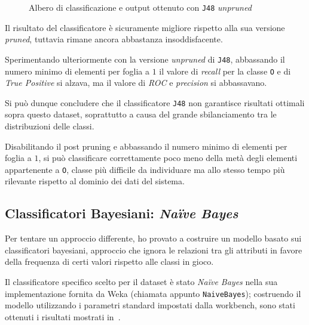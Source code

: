 \begin{figure}[H]
  \centering
  \begin{subfigure}{0.35\textwidth}
    \centering
    \label{fig:j48-unpruned:tree}
  \end{subfigure}
  \hfill
  \begin{subfigure}{0.6\textwidth}
    \centering
    \label{subfig:j48-unpruned:result}
  \end{subfigure}
  \caption{Albero di classificazione e output ottenuto con \texttt{J48} \emph{unpruned}}%
  \label{fig:j48-unpruned}
\end{figure}

Il risultato del classificatore è sicuramente migliore rispetto alla sua versione \emph{pruned}, tuttavia rimane ancora abbastanza insoddisfacente.

Sperimentando ulteriormente con la versione \emph{unpruned} di \texttt{J48},
abbassando il numero minimo di elementi per foglia a \(1\) il valore di \emph{recall} per la classe \texttt{O} e di \emph{True Positive} si alzava,
ma il valore di \emph{ROC} e \emph{precision} si abbassavano.

Si può dunque concludere che il classificatore \texttt{J48} non garantisce risultati ottimali sopra questo dataset, soprattutto a causa del grande sbilanciamento tra le distribuzioni delle classi.

Disabilitando il post pruning e abbassando il numero minimo di elementi per foglia a \(1\), si può classificare correttamente poco meno della metà degli elementi appartenente a \texttt{O},
classe più difficile da individuare ma allo stesso tempo più rilevante rispetto al dominio dei dati del sistema.

\subsection{Classificatori Bayesiani: \emph{Naïve Bayes}}\label{subsec:bayes}

Per tentare un approccio differente, ho provato a costruire un modello basato sui classificatori bayesiani,
approccio che ignora le relazioni tra gli attributi in favore della frequenza di certi valori rispetto alle classi in gioco.

Il classificatore specifico scelto per il dataset è stato \emph{Naïve Bayes} nella sua implementazione fornita da Weka (chiamata appunto \texttt{NaiveBayes});
costruendo il modello utilizzando i parametri standard impostati dalla workbench, sono stati ottenuti i risultati mostrati in~.

